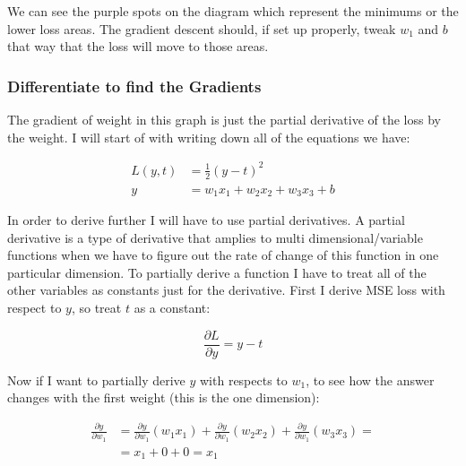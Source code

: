 \documentclass{article}
\begin{document}
We can see the purple spots on the diagram which represent the minimums or
the lower loss areas. The gradient descent should, if set up properly, tweak
$w_1$ and $b$ that way that the loss will move to those areas.





\subsubsection{Differentiate to find the Gradients}

The gradient of weight in this graph is just the partial derivative of the loss by the weight.
I will start of with writing down all of the equations we have:

\[
\begin{split}
L(y, t) &= \frac{1}{2}{(y - t)} ^ 2 \\
y &= w_1x_1 + w_2x_2 + w_3x_3 + b
\end{split}
\]

In order to derive further I will have to use partial derivatives. A partial derivative
is a type of derivative that amplies to multi dimensional/variable functions when
we have to figure out the rate of change of this function in one particular dimension.
To partially derive a function I have to treat all of the other variables as
constants just for the derivative.
First I derive MSE loss with respect to $y$, so treat $t$ as a constant:

\begin{equation}
\frac{\partial L}{\partial y} = y - t
\label{eq:dLdy}
\end{equation}

Now if I want to partially derive $y$ with respects to $w_1$, to see how
the answer changes with the first weight (this is the one dimension):

\[
\begin{split}
\frac{\partial y}{\partial w_1} &=
\frac{\partial y}{\partial w_1} (w_1 x_1) +
\frac{\partial y}{\partial w_1} (w_2 x_2) +
\frac{\partial y}{\partial w_1} (w_3 x_3) = \\
&= x_1 + 0 + 0 = x_1
\end{split}
\]
\end{document}
